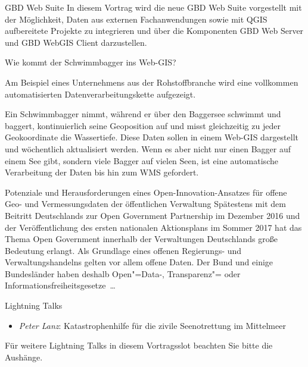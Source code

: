 \renewcommand{\conferenceDay}{\donnerstag}

%
{GBD Web Suite}{}%
{
In diesem Vortrag wird die neue GBD Web Suite vorgestellt mit der Möglichkeit, Daten aus externen
Fachanwendungen sowie mit QGIS aufbereitete Projekte zu integrieren und über die Komponenten GBD
Web Server und GBD WebGIS Client darzustellen.%
}

%
{Wie kommt der Schwimmbagger ins Web-GIS?}%
{}%
{%
Am Beispiel eines Unternehmens aus der Rohstoffbranche wird eine vollkommen automatisierten
Datenverarbeitungskette aufgezeigt.

Ein Schwimmbagger nimmt, während er über den Baggersee schwimmt
und baggert, kontinuierlich seine Geoposition auf und misst gleichzeitig zu jeder Geokoordinate die
Wassertiefe. Diese Daten sollen in einem Web-GIS dargestellt und wöchentlich aktualisiert werden.
Wenn es aber nicht nur einen Bagger auf einem See gibt, sondern viele Bagger auf vielen Seen, ist
eine automatische Verarbeitung der Daten bis hin zum WMS gefordert.%
}


%
{Potenziale und Herausforderungen eines Open-Innovation-Ansatzes für offene Geo- und
Vermessungsdaten der öffentlichen Verwaltung}%
{}%
{%
Spätestens mit dem Beitritt Deutschlands zur Open Government Partnership im Dezember 2016 und der
Veröffentlichung des ersten nationalen Aktionsplans im Sommer 2017 hat das Thema Open Government
innerhalb der Verwaltungen Deutschlands große Bedeutung erlangt. Als Grundlage eines offenen
Regierungs- und Verwaltungshandelns gelten vor allem offene Daten. Der Bund und einige
Bundesländer haben deshalb Open"=\mbox{Data-,} Transparenz"= oder Informationsfreiheitsgesetze~\ldots%
}



\abstractAPH{}%
{Lightning Talks}%
{}%
{%
  \vspace{-2em}
  \begin{itemize}
    \item \emph{Peter Lanz}: Katastrophenhilfe für die zivile Seenotrettung im Mittelmeer
  \end{itemize}

  \noindent Für weitere Lightning Talks in diesem Vortragsslot beachten Sie bitte die Aushänge.
}

